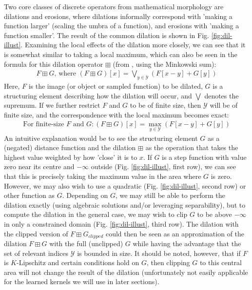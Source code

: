 \documentclass[a4paper, 12pt]{report}
\begin{document}
Two core classes of discrete operators from mathematical morphology are dilations and erosions, where dilations informally correspond with 'making a function larger' (scaling the umbra of a function), and erosions with 'making a function smaller'. The result of the common dilation is shown in Fig. \ref{fig:dil-illust}. Examining the local effects of the dilation more closely, we can see that it is somewhat similar to taking a local maximum, which can also be seen in the formula for this dilation operator $\boxplus$  (from \cite{heijmans1996morphological}, using the Minkowski sum): 
\begin{align}
F \boxplus G \textrm{, where }(F \boxplus G)[x] = \bigvee_ {y\in\mathcal{Y}} \left(F[x-y] + G[y]\right)	
\end{align}
\noindent
Here, $F$ is the image (or object or sampled function) to be dilated, $G$ is a structuring element describing how the dilation will occur, and $\bigvee$ denotes the supremum. If we further restrict $F$ and $G$ to be of finite size, then $\mathcal{Y}$ will be of finite size, and the correspondence with the local maximum becomes exact:
\begin{align}
\textrm{For finite-size }F\textrm{ and }G: (F \boxplus G)[x] = \max_ {y\in\mathcal{Y}} \left(F[x-y] + G[y]\right)	
\end{align}
 An intuitive explanation would be to see the structuring element $G$ as a (negated) distance function and the dilation $\boxplus$ as the operation that takes the highest value weighted by how 'close' it is to $x$. If $G$ is a step function with value zero near its centre and $-\infty$ outside (Fig. \ref{fig:dil-illust}, first row), we can see that this is precisely taking the maximum value in the area where $G$ is zero. However, we may also wish to use a quadratic (Fig. \ref{fig:dil-illust}, second row) or other function as $G$. Depending on $G$, we may still be able to perform the dilation exactly (using algebraic solutions and/or leveraging separability), but to compute the dilation in the general case, we may wish to clip $G$ to be above $-\infty$ in only a constrained domain (Fig. \ref{fig:dil-illust}, third row). The dilation with the clipped version of $F\boxplus G_{clipped}$ could then be seen as an approximation of the dilation $F\boxplus G$ with the full (unclipped) $G$ while having the advantage that the set of relevant indices $\mathcal{Y}$ is bounded in size. It should be noted, however, that if $F$ is $K$-Lipschitz and certain conditions hold on $G$, then clipping $G$ to this central area will not change the result of the dilation (unfortunately not easily applicable for the learned kernels we will use in later sections).
\end{document}
